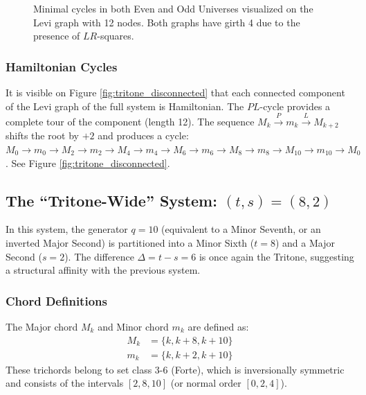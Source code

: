 \documentclass[12pt,letterpaper]{amsart}
\begin{document}
\begin{figure}[H]
    \caption{Minimal cycles in both Even and Odd Universes visualized on the Levi graph with 12 nodes. Both graphs have girth 4 due to the presence of $LR$-squares.}
    \label{fig:tritone_minimal}
\end{figure}
\subsubsection{Hamiltonian Cycles}
It is visible on Figure \ref{fig:tritone_disconnected} that each connected component of the Levi graph of the full system is Hamiltonian. The $PL$-cycle provides a complete tour of the component (length 12).
The sequence $M_k \xrightarrow{P} m_k \xrightarrow{L} M_{k+2}$ shifts the root by $+2$ and produces a cycle: $M_0 \to m_0 \to M_2 \to m_2 \to M_4 \to m_4 \to M_6 \to m_6 \to M_8 \to m_8 \to M_{10} \to m_{10} \to M_0$. See Figure \ref{fig:tritone_disconnected}.

\subsection{The ``Tritone-Wide'' System: \texorpdfstring{$(t,s)=(8,2)$}{t=8, s=2}}

In this system, the generator $q=10$ (equivalent to a Minor Seventh, or an inverted Major Second) is partitioned into a Minor Sixth ($t=8$) and a Major Second ($s=2$). The difference $\Delta = t-s = 6$ is once again the Tritone, suggesting a structural affinity with the previous system.

\subsubsection{Chord Definitions}
The Major chord $M_k$ and Minor chord $m_k$ are defined as:
\begin{align}
    M_k &= \{k, k+8, k+10\} \\
    m_k &= \{k, k+2, k+10\}
\end{align}
These trichords belong to set class 3-6 (Forte), which is inversionally symmetric and consists of the intervals $[2, 8, 10]$ (or normal order $[0, 2, 4]$).
\end{document}
